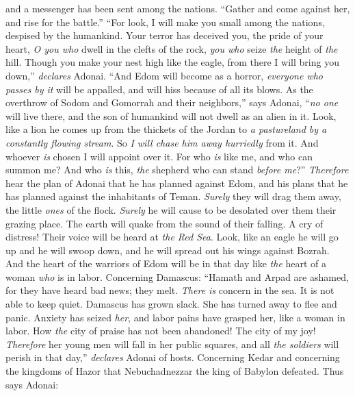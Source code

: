 \begin{biblechapter}
and a messenger has been sent among the nations. 
“Gather and come against her, 
and rise for the battle.”
\verse “For look, I will make you small among the nations, 
despised by the humankind.
\verse Your terror has deceived you, 
the pride of your heart, 
\textit{O you who} dwell in the clefts of the rock, 
\textit{you who} seize \textit{the} height of \textit{the} hill. 
Though you make your nest high like the eagle, 
from there I will bring you down,” \textit{declares} Adonai.
\verse “And Edom will become as a horror, 
\textit{everyone who passes by it} will be appalled, 
and will hiss because of all its blows.
\verse As the overthrow of Sodom and Gomorrah 
and their neighbors,” says Adonai, 
“\textit{no one} will live there, 
and the son of humankind will not dwell as an alien in it.
\verse Look, like a lion he comes up from the thickets of the Jordan 
to \textit{a pastureland by a constantly flowing stream}. 
So \textit{I will chase him away hurriedly} from it. 
And whoever \textit{is} chosen I will appoint over it. 
For who \textit{is} like me, and who can summon me? 
And who \textit{is} this, \textit{the} shepherd who can stand \textit{before me}?”
\verse \textit{Therefore} hear the plan of Adonai that he has planned against Edom, 
and his plans that he has planned against the inhabitants of Teman. 
\textit{Surely} they will drag them away, 
the little \textit{ones} of the flock. 
\textit{Surely} he will cause to be desolated over them 
their grazing place.
\verse The earth will quake from the sound of their falling. 
A cry of distress! Their voice will be heard at \textit{the Red Sea}.
\verse Look, like an eagle he will go up and he will swoop down, 
and he will spread out his wings against Bozrah. 
And the heart of the warriors of Edom will be in that day 
like \textit{the} heart of a woman \textit{who} is in labor.
 Concerning Damascus:
\verse “Hamath and Arpad are ashamed, 
for they have heard bad news; 
they melt. 
\textit{There is} concern in the sea. 
It is not able to keep quiet.
\verse Damascus has grown slack. 
She has turned away to flee and panic. 
Anxiety has seized \textit{her}, 
and labor pains have grasped her, 
like a woman in labor.
\verse How \textit{the} city of praise has not been abandoned! 
The city of my joy!
\verse \textit{Therefore} her young men will fall in her public squares, 
and all \textit{the soldiers} will perish in that day,” \textit{declares} Adonai of hosts.
 Concerning Kedar and concerning the kingdoms of Hazor that Nebuchadnezzar the king of Babylon defeated. Thus says Adonai:

\end{biblechapter}
